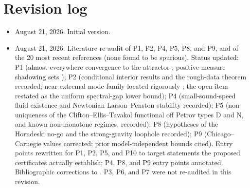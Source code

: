 \documentclass[11pt,letterpaper]{article}
\begin{document}
\section*{Revision log}
\begin{itemize}[leftmargin=2.6em,itemsep=1pt,topsep=2pt]
\item[v1.0] August 21, 2026. Initial version.
\item[v1.1] August 21, 2026. Literature re-audit of P1, P2, P4, P5, P8, and P9, and of the 20 most recent references (none found to be spurious). Status updated: P1 (almost-everywhere convergence to the attractor \cite{brehm2016}; positive-measure shadowing sets \cite{beguindutilleul2023}); P2 (conditional interior results and the rough-data theorem recorded; near-extremal mode family located rigorously \cite{hintz2025}; the open item restated as the uniform spectral-gap lower bound); P4 (small-sound-speed fluid existence \cite{ghj2023} and Newtonian Larson--Penston stability \cite{ghjs2025} recorded); P5 (non-uniqueness of the Clifton--Ellis--Tavakol functional off Petrov types D and N, and known non-monotone regimes, recorded); P8 (hypotheses of the Horndeski no-go and the strong-gravity loophole recorded); P9 (Chicago--Carnegie values corrected; prior model-independent bounds cited). Entry points rewritten for P1, P2, P5, and P10 to target statements the proposed certificates actually establish; P4, P8, and P9 entry points annotated. Bibliographic corrections to \cite{hubert2025,nexus2026,chenhou2022,desi2025,freedman2025,cai2026,poulin2023,tadpole2020}. P3, P6, and P7 were not re-audited in this revision.

\end{itemize}
\end{document}
